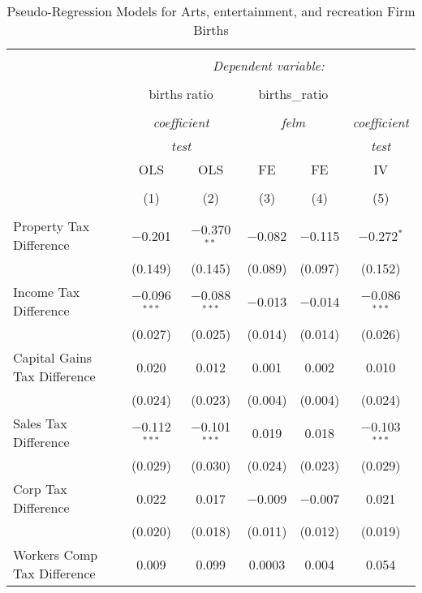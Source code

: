 
\begin{table}[!htbp] \centering 
  \caption{Pseudo-Regression Models for  Arts, entertainment, and recreation Firm Births} 
  \label{} 
\begin{tabular}{@{\extracolsep{5pt}}lccccc} 
\\[-1.8ex]\hline 
\hline \\[-1.8ex] 
 & \multicolumn{5}{c}{\textit{Dependent variable:}} \\ 
\cline{2-6} 
\\[-1.8ex] & \multicolumn{2}{c}{births ratio} & \multicolumn{2}{c}{births\_ratio} &   \\ 
\\[-1.8ex] & \multicolumn{2}{c}{\textit{coefficient}} & \multicolumn{2}{c}{\textit{felm}} & \textit{coefficient} \\ 
 & \multicolumn{2}{c}{\textit{test}} & \multicolumn{2}{c}{\textit{}} & \textit{test} \\ 
 & OLS & OLS & FE & FE & IV \\ 
\\[-1.8ex] & (1) & (2) & (3) & (4) & (5)\\ 
\hline \\[-1.8ex] 
 Property Tax Difference & $-$0.201 & $-$0.370$^{**}$ & $-$0.082 & $-$0.115 & $-$0.272$^{*}$ \\ 
  & (0.149) & (0.145) & (0.089) & (0.097) & (0.152) \\ 
  Income Tax Difference & $-$0.096$^{***}$ & $-$0.088$^{***}$ & $-$0.013 & $-$0.014 & $-$0.086$^{***}$ \\ 
  & (0.027) & (0.025) & (0.014) & (0.014) & (0.026) \\ 
  Capital Gains Tax Difference & 0.020 & 0.012 & 0.001 & 0.002 & 0.010 \\ 
  & (0.024) & (0.023) & (0.004) & (0.004) & (0.024) \\ 
  Sales Tax Difference & $-$0.112$^{***}$ & $-$0.101$^{***}$ & 0.019 & 0.018 & $-$0.103$^{***}$ \\ 
  & (0.029) & (0.030) & (0.024) & (0.023) & (0.029) \\ 
  Corp Tax Difference & 0.022 & 0.017 & $-$0.009 & $-$0.007 & 0.021 \\ 
  & (0.020) & (0.018) & (0.011) & (0.012) & (0.019) \\ 
  Workers Comp Tax Difference & 0.009 & 0.099 & 0.0003 & 0.004 & 0.054 \\ 

\end{tabular}
\end{table}

